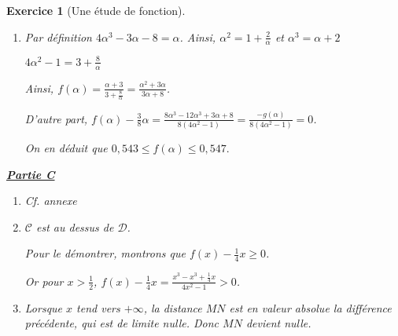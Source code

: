 \documentclass[12pt,a4paper]{article}
\theoremstyle{break}
\theoremstyle{nobreak}
\newtheorem{exercice}{Exercice}
\theoremstyle{nonumberplain}
\begin{document}
\begin{exercice}[Une étude de fonction]
\begin{enumerate}
    \item Par définition $4\alpha^3 - 3\alpha - 8 = \alpha$. Ainsi,
      $\alpha^2 = 1 + \frac2{\alpha}$ et $\alpha^3 = \alpha + 2$

      $4\alpha^2 - 1 = 3 + \frac8{\alpha}$

      Ainsi, $f(\alpha) = \frac{\alpha + 3}{3 + \frac8{\alpha}}
      = \frac{\alpha^2 + 3\alpha}{3\alpha + 8}$.

      D'autre part, $f(\alpha) - \frac38\alpha = \frac{8\alpha^3 -
      12\alpha^3 + 3\alpha + 8}{8(4\alpha^2 - 1)} = \frac{-g(\alpha)}{
      8(4\alpha^2 - 1)} = 0$.

      On en déduit que $\boxed{0,543 \leqslant f(\alpha) \leqslant
      0,547.}$

  \end{enumerate}

  \noindent\textbf{\underline{Partie C}}

  \begin{enumerate}
    \item Cf. annexe
    \item $\mathscr{C}$ est au dessus de $\mathcal{D}$.

      Pour le démontrer, montrons que $f(x) - \frac14 x \geqslant 0$.

      Or pour $x> \frac12$, $f(x) - \frac14 x = \frac{x^3 - x^3 +
      \frac14 x}{4x^2 - 1} > 0$.
    \item Lorsque $x$ tend vers $+\infty$, la distance $MN$ est en
      valeur absolue la différence précédente, qui est de limite nulle.
      Donc $MN$ devient nulle.
  \end{enumerate}

\end{exercice}
\end{document}
